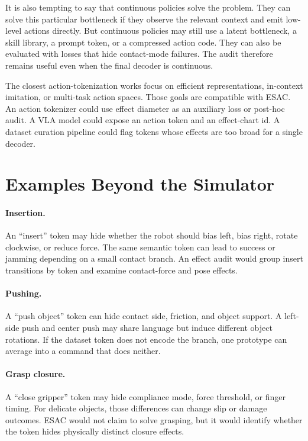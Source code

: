 \documentclass{article}
\begin{document}
It is also tempting to say that continuous policies solve the problem. They can
solve this particular bottleneck if they observe the relevant context and emit
low-level actions directly. But continuous policies may still use a latent
bottleneck, a skill library, a prompt token, or a compressed action code. They
can also be evaluated with losses that hide contact-mode failures. The audit
therefore remains useful even when the final decoder is continuous.

The closest action-tokenization works focus on efficient representations,
in-context imitation, or multi-task action spaces. Those goals are compatible
with ESAC. An action tokenizer could use effect diameter as an auxiliary loss
or post-hoc audit. A VLA model could expose an action token and an effect-chart
id. A dataset curation pipeline could flag tokens whose effects are too broad
for a single decoder.

\section{Examples Beyond the Simulator}

\paragraph{Insertion.}
An ``insert'' token may hide whether the robot should bias left, bias right,
rotate clockwise, or reduce force. The same semantic token can lead to success
or jamming depending on a small contact branch. An effect audit would group
insert transitions by token and examine contact-force and pose effects.

\paragraph{Pushing.}
A ``push object'' token can hide contact side, friction, and object support. A
left-side push and center push may share language but induce different object
rotations. If the dataset token does not encode the branch, one prototype can
average into a command that does neither.

\paragraph{Grasp closure.}
A ``close gripper'' token may hide compliance mode, force threshold, or finger
timing. For delicate objects, those differences can change slip or damage
outcomes. ESAC would not claim to solve grasping, but it would identify whether
the token hides physically distinct closure effects.
\end{document}
